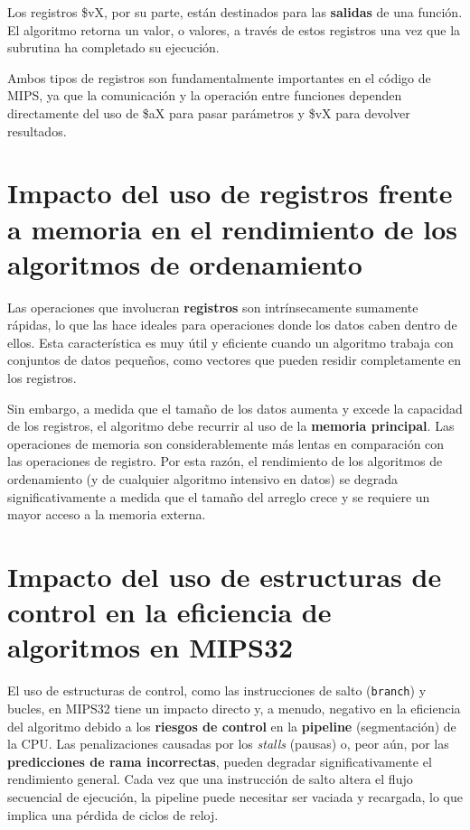 \documentclass{article}
\begin{document}
Los registros \$vX, por su parte, están destinados para las \textbf{salidas} de una función. El algoritmo retorna un valor, o valores, a través de estos registros una vez que la subrutina ha completado su ejecución.

Ambos tipos de registros son fundamentalmente importantes en el código de MIPS, ya que la comunicación y la operación entre funciones dependen directamente del uso de \$aX para pasar parámetros y \$vX para devolver resultados.

\section{Impacto del uso de registros frente a memoria en el rendimiento de los algoritmos de ordenamiento}
Las operaciones que involucran \textbf{registros} son intrínsecamente sumamente rápidas, lo que las hace ideales para operaciones donde los datos caben dentro de ellos. Esta característica es muy útil y eficiente cuando un algoritmo trabaja con conjuntos de datos pequeños, como vectores que pueden residir completamente en los registros.

Sin embargo, a medida que el tamaño de los datos aumenta y excede la capacidad de los registros, el algoritmo debe recurrir al uso de la \textbf{memoria principal}. Las operaciones de memoria son considerablemente más lentas en comparación con las operaciones de registro. Por esta razón, el rendimiento de los algoritmos de ordenamiento (y de cualquier algoritmo intensivo en datos) se degrada significativamente a medida que el tamaño del arreglo crece y se requiere un mayor acceso a la memoria externa.

\section{Impacto del uso de estructuras de control en la eficiencia de algoritmos en MIPS32}
El uso de estructuras de control, como las instrucciones de salto (\texttt{branch}) y bucles, en MIPS32 tiene un impacto directo y, a menudo, negativo en la eficiencia del algoritmo debido a los \textbf{riesgos de control} en la \textbf{pipeline} (segmentación) de la CPU. Las penalizaciones causadas por los \textit{stalls} (pausas) o, peor aún, por las \textbf{predicciones de rama incorrectas}, pueden degradar significativamente el rendimiento general. Cada vez que una instrucción de salto altera el flujo secuencial de ejecución, la pipeline puede necesitar ser vaciada y recargada, lo que implica una pérdida de ciclos de reloj.
\end{document}
